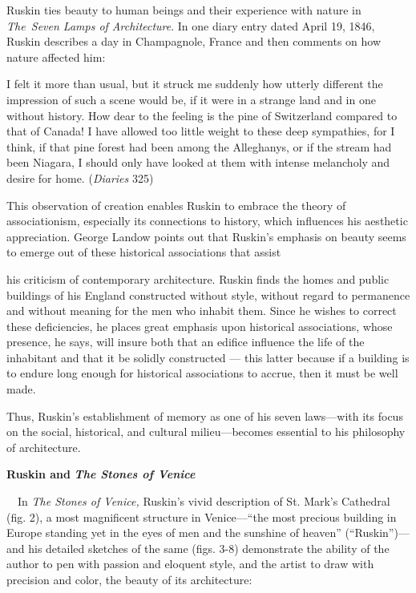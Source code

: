 Ruskin ties beauty to human beings and their experience with nature in
\textit{The~Seven Lamps of Architecture}.  In one diary entry dated
April 19, 1846, Ruskin describes a day in Champagnole, France and then
comments on how nature affected him: 

I felt it more than usual, but it struck me suddenly how utterly
different the impression of such a scene would be, if it were in a
strange land and in one without history.  How dear to the feeling is
the pine of Switzerland compared to that of Canada!  I have allowed too
little weight to these deep sympathies, for I think, if that pine
forest had been among the Alleghanys, or if the stream had been
Niagara, I should only have looked at them with intense melancholy and
desire for home.  (\textit{Diaries} 325) 

This observation of creation enables Ruskin to embrace the theory of
associationism, especially its connections to history, which influences
his aesthetic appreciation.  George Landow points out that Ruskin’s
emphasis on beauty seems to emerge out of these historical associations
that assist 

{\color{black}
his criticism of contemporary architecture.  Ruskin finds the homes and
public buildings of his England constructed without style, without
regard to permanence and without meaning for the men who inhabit them. 
Since he wishes to correct these deficiencies, he places great emphasis
upon historical associations, whose presence, he says, will insure both
that an edifice influence the life of the inhabitant and that it be
solidly constructed — this latter because if a building is to endure
long enough for historical associations to accrue, then it must be well
made.  }

{\color{black}
Thus, Ruskin’s establishment of memory as one of his seven laws—with its
focus on the social, historical, and cultural milieu—becomes essential
to his philosophy of architecture. }

{\centering\color{black}
\textbf{Ruskin and }\textbf{\textit{The Stones of Venice}}
\par}

{\color{black}
\ \ In \textit{The Stones of Venice,} Ruskin’s vivid description of St.
Mark’s Cathedral (fig. 2), a most magnificent structure in Venice—“the
most precious building in Europe standing yet in the eyes of men and
the sunshine of heaven” (“Ruskin”)—and his detailed sketches of the
same (figs. 3-8) demonstrate the ability of the author to pen with
passion and eloquent style, and the artist to draw with precision and
color, the beauty of its architecture: }

